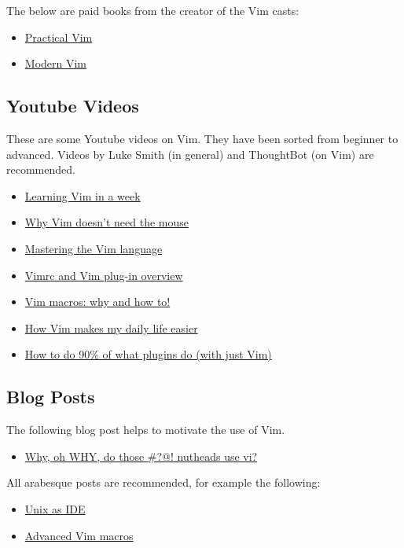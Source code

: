 \documentclass[11pt]{article}
\begin{document}
The below are paid books from the creator of the Vim casts:
\begin{itemize}
\item \href{https://pragprog.com/book/dnvim2/practical-vim-second-edition}{Practical Vim}
\item \href{https://pragprog.com/book/modvim/modern-vim}{Modern Vim}
\end{itemize}
\subsection{Youtube Videos}
\label{sec:org3e090e0}
These are some Youtube videos on Vim. They have been sorted from beginner to
advanced. Videos by Luke Smith (in general) and ThoughtBot (on Vim) are 
recommended.
\begin{itemize}
\item \href{https://www.youtube.com/watch?v=\_NUO4JEtkDw}{Learning Vim in a week}
\item \href{https://www.youtube.com/watch?v=tQCRVkSFFEc}{Why Vim doesn't need the mouse}
\item \href{https://www.youtube.com/watch?v=wlR5gYd6um0}{Mastering the Vim language}
\item \href{https://www.youtube.com/watch?v=cTBgtN-s2Zw}{Vimrc and Vim plug-in overview}
\item \href{https://www.youtube.com/watch?v=wRFEBw02aT8}{Vim macros: why and how to!}
\item \href{https://www.youtube.com/watch?v=NzD2UdQl5Gc}{How Vim makes my daily life easier}
\item \href{https://www.youtube.com/watch?v=XA2WjJbmmoM}{How to do 90\% of what plugins do (with just Vim)}
\end{itemize}
\subsection{Blog Posts}
\label{sec:org8bfbd1b}
The following blog post helps to motivate the use of Vim.
\begin{itemize}
\item \href{http://www.viemu.com/a-why-vi-vim.html}{Why, oh WHY, do those \#?@! nutheads use vi?}
\end{itemize}

All arabesque posts are recommended, for example the following:
\begin{itemize}
\item \href{https://sanctum.geek.nz/arabesque/series/unix-as-ide/}{Unix as IDE}
\item \href{https://sanctum.geek.nz/arabesque/advanced-vim-macros/}{Advanced Vim macros}
\end{itemize}
\end{document}
